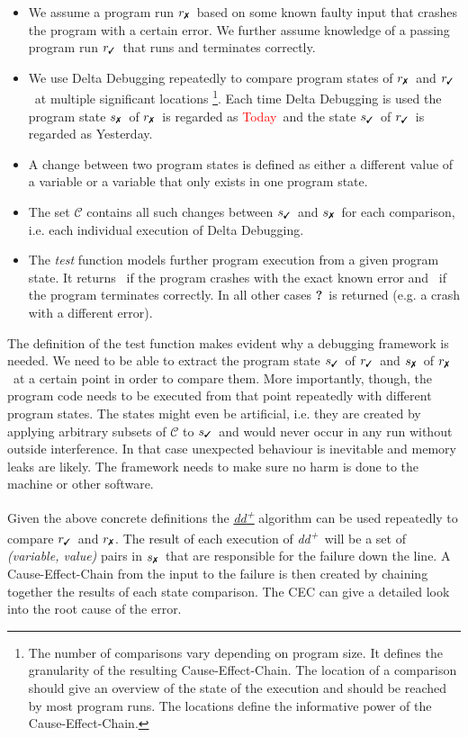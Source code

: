 \documentclass[a4paper,UKenglish]{lipics-v2018}
\newcommand{\ddp}{\textit{dd\textsuperscript{+}}}
\newcommand{\green}[1]{\textcolor{td-green}{#1}}
\newcommand{\red}[1]{\textcolor{red}{#1}}
\newcommand{\yd}[0]{\green{Yesterday}}
\newcommand{\td}[0]{\red{Today}}
\newcommand{\C}[0]{\ensuremath{\mathcal{C}}}
\newcommand{\cmark}{\text{\ding{51}}}
\newcommand{\xmark}{\text{\ding{55}}}
\newcommand{\qmark}{\textbf{?}}
\newcommand{\rpass}[0]{\ensuremath{r_{\cmark}}}
\newcommand{\rfail}[0]{\ensuremath{r_{\xmark}}}
\newcommand{\spass}[0]{\ensuremath{s_{\cmark}}}
\newcommand{\sfail}[0]{\ensuremath{s_{\xmark}}}
\begin{document}
\begin{itemize}
	\item We assume a program run \rfail\ based on some known faulty input that crashes the program with a certain error. We further assume knowledge of a passing program run \rpass\ that runs and terminates correctly.
	\item We use Delta Debugging repeatedly to compare program states of \rfail\ and \rpass\ at multiple significant locations \footnote{The number of comparisons vary depending on program size. It defines the granularity of the resulting Cause-Effect-Chain. The location of a comparison should give an overview of the state of the execution and should be reached by most program runs. The locations define the informative power of the Cause-Effect-Chain.}. Each time Delta Debugging is used the program state \sfail\ of \rfail\ is regarded as \td\ and the state \spass\ of \rpass\ is regarded as \yd.
	\item A change between two program states is defined as either a different value of a variable or a variable that only exists in one program state.
	\item The set $\C$ contains all such changes between \spass\ and \sfail\ for each comparison, i.e. each individual execution of Delta Debugging.
	\item The \textit{test} function models further program execution from a given program state. It returns \xmark\ if the program crashes with the exact known error and \cmark\ if the program terminates correctly. In all other cases \qmark\ is returned (e.g. a crash with a different error). 
\end{itemize}

The definition of the test function makes evident why a debugging framework is needed. We need to be able to extract the program state \spass\ of \rpass\ and \sfail\ of \rfail\ at a certain point in order to compare them. More importantly, though, the program code needs to be executed from that point repeatedly with different program states. The states might even be artificial, i.e. they are created by applying arbitrary subsets of $\C$ to \spass\ and would never occur in any run without outside interference. In that case unexpected behaviour is inevitable and memory leaks are likely. The framework needs to make sure no harm is done to the machine or other software.

Given the above concrete definitions the \hyperref[fig:ddp]{\ddp} algorithm can be used repeatedly to compare \rpass\ and \rfail. The result of each execution of \ddp\ will be a set of \textit{(variable, value)} pairs in \sfail\ that are responsible for the failure down the line. A Cause-Effect-Chain from the input to the failure is then created by chaining together the results of each state comparison. The CEC can give a detailed look into the root cause of the error.\\
\end{document}
